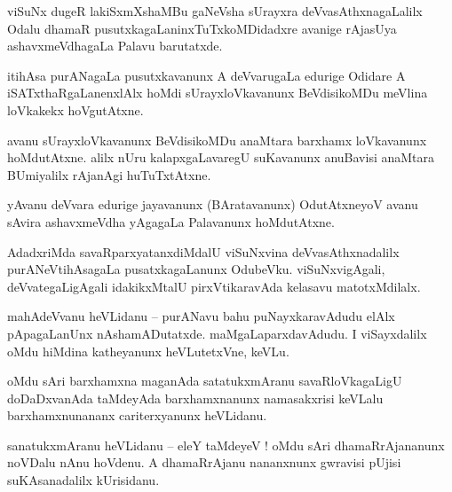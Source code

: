 \documentclass{article}
\begin{document}
\begin{mn}%
viSuNx dugeR lakiSxmXshaMBu gaNeVsha sUrayxra deVvasAthxnagaLalilx Odalu dhamaR 
pusutxkagaLaninxTuTxkoMDidadxre avanige rAjasUya ashavxmeVdhagaLa Palavu barutatxde.
\end{mn}

\begin{mn}%
itihAsa purANagaLa pusutxkavanunx A deVvarugaLa edurige Odidare A iSATxthaRgaLanenxlAlx hoMdi 
sUrayxloVkavanunx BeVdisikoMDu meVlina loVkakekx hoVgutAtxne.
\end{mn}

\begin{mn}%
avanu sUrayxloVkavanunx BeVdisikoMDu anaMtara barxhamx loVkavanunx hoMdutAtxne. alilx nUru 
kalapxgaLavaregU suKavanunx anuBavisi anaMtara BUmiyalilx rAjanAgi huTuTxtAtxne.
\end{mn}

\begin{mn}%
yAvanu deVvara edurige jayavanunx (BAratavanunx) OdutAtxneyoV avanu sAvira ashavxmeVdha yAgagaLa 
Palavanunx hoMdutAtxne.
\end{mn}

\begin{mn}%
AdadxriMda savaRparxyatanxdiMdalU viSuNxvina deVvasAthxnadalilx purANeVtihAsagaLa pusatxkagaLanunx 
OdubeVku. viSuNxvigAgali, deVvategaLigAgali idakikxMtalU pirxVtikaravAda kelasavu matotxMdilalx.
\end{mn}


\begin{mn}%
mahAdeVvanu heVLidanu -- purANavu bahu puNayxkaravAdudu elAlx pApagaLanUnx nAshamADutatxde. 
maMgaLaparxdavAdudu. I viSayxdalilx oMdu hiMdina katheyanunx heVLutetxVne, keVLu.
\end{mn}

\begin{mn}%
oMdu sAri barxhamxna maganAda satatukxmAranu savaRloVkagaLigU doDaDxvanAda taMdeyAda barxhamxnanunx 
namasakxrisi keVLalu barxhamxnunananx cariterxyanunx heVLidanu.
\end{mn}

\begin{mn}%
sanatukxmAranu heVLidanu -- eleY taMdeyeV ! oMdu sAri dhamaRrAjananunx noVDalu nAnu hoVdenu. A 
dhamaRrAjanu nananxnunx gwravisi pUjisi suKAsanadalilx kUrisidanu.
\end{mn}
\end{document}
